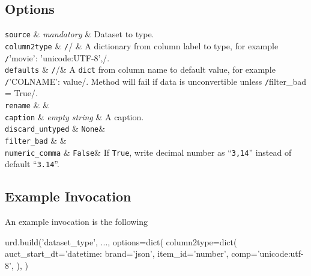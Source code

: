 \subsection{Options}
\starttable
  \RP \texttt{source} & \textsl{mandatory} & Dataset to type.\\[1ex]

  \RP \texttt{column2type} & \texttt/{}/ & A dictionary from column
  label to type, for example \texttt/{'movie': 'unicode:UTF-8',}/.\\[1ex]


  \RP \texttt{defaults} & \texttt/{}/& A \texttt{dict} from
  column name to default value, for example
  \texttt/{'COLNAME': value}/.  Method will fail if data
  is unconvertible unless \texttt/filter_bad = True/.\\[1ex]

  \RP \texttt{rename} & &  \\[1ex]

  \RP \texttt{caption} & \textsl{empty string} & A caption.\\[1ex]

  \RP \texttt{discard\_untyped} & \texttt{None}&  \\[1ex]

  \RP \texttt{filter\_bad} & &  \\[1ex]

  \RP \texttt{numeric\_comma} & \texttt{False}& If
  \texttt{True}, write decimal number as ``\texttt{3,14}'' instead of
  default ``\texttt{3.14}''.\\[1ex]
\stoptable
  



\subsection{Example Invocation}
An example invocation is the following

\begin{python}
urd.build('dataset_type', ...,
  options=dict(
    column2type=dict(
      auct_start_dt='datetime:%
      brand='json',
      item_id='number',
      comp='unicode:utf-8',
    ),
  )
\end{python}


